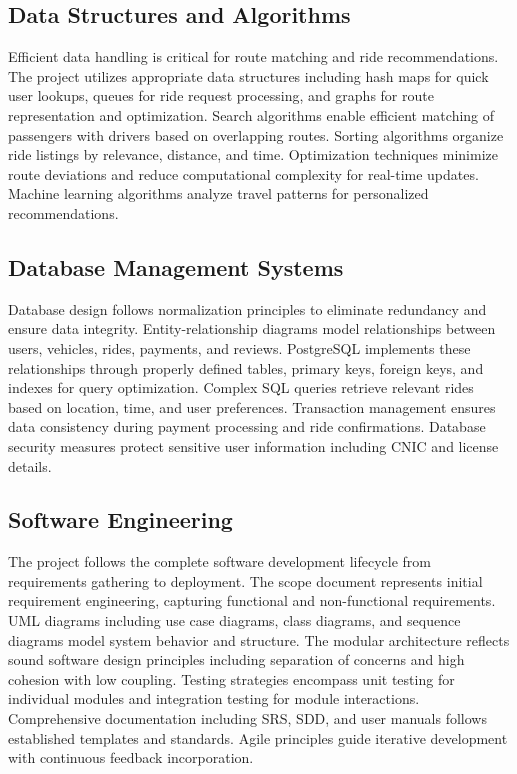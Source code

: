 \subsection{Data Structures and Algorithms}

Efficient data handling is critical for route matching and ride recommendations. The project utilizes appropriate data structures including hash maps for quick user lookups, queues for ride request processing, and graphs for route representation and optimization. Search algorithms enable efficient matching of passengers with drivers based on overlapping routes. Sorting algorithms organize ride listings by relevance, distance, and time. Optimization techniques minimize route deviations and reduce computational complexity for real-time updates. Machine learning algorithms analyze travel patterns for personalized recommendations.

\subsection{Database Management Systems}

Database design follows normalization principles to eliminate redundancy and ensure data integrity. Entity-relationship diagrams model relationships between users, vehicles, rides, payments, and reviews. PostgreSQL implements these relationships through properly defined tables, primary keys, foreign keys, and indexes for query optimization. Complex SQL queries retrieve relevant rides based on location, time, and user preferences. Transaction management ensures data consistency during payment processing and ride confirmations. Database security measures protect sensitive user information including CNIC and license details.

\subsection{Software Engineering}

The project follows the complete software development lifecycle from requirements gathering to deployment. The scope document represents initial requirement engineering, capturing functional and non-functional requirements. UML diagrams including use case diagrams, class diagrams, and sequence diagrams model system behavior and structure. The modular architecture reflects sound software design principles including separation of concerns and high cohesion with low coupling. Testing strategies encompass unit testing for individual modules and integration testing for module interactions. Comprehensive documentation including SRS, SDD, and user manuals follows established templates and standards. Agile principles guide iterative development with continuous feedback incorporation.

